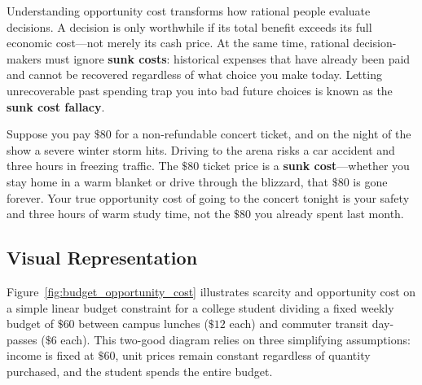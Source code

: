 \documentclass[11pt,letterpaper]{article}
\begin{document}
Understanding opportunity cost transforms how rational people evaluate decisions. A decision is only worthwhile if its total benefit exceeds its full economic cost—not merely its cash price. At the same time, rational decision-makers must ignore \textbf{sunk costs}: historical expenses that have already been paid and cannot be recovered regardless of what choice you make today. Letting unrecoverable past spending trap you into bad future choices is known as the \textbf{sunk cost fallacy}.

\begin{tcolorbox}[colback=yellow!10!white,colframe=orange!80!black,title=\textbf{Clear It Up: Sunk Costs Are Not Opportunity Costs}]
Suppose you pay $\$80$ for a non-refundable concert ticket, and on the night of the show a severe winter storm hits. Driving to the arena risks a car accident and three hours in freezing traffic. The $\$80$ ticket price is a \textbf{sunk cost}—whether you stay home in a warm blanket or drive through the blizzard, that $\$80$ is gone forever. Your true opportunity cost of going to the concert tonight is your safety and three hours of warm study time, not the $\$80$ you already spent last month.
\end{tcolorbox}

\subsection*{Visual Representation}
Figure~\ref{fig:budget_opportunity_cost} illustrates scarcity and opportunity cost on a simple linear budget constraint for a college student dividing a fixed weekly budget of $\$60$ between campus lunches ($\$12$ each) and commuter transit day-passes ($\$6$ each). This two-good diagram relies on three simplifying assumptions: income is fixed at $\$60$, unit prices remain constant regardless of quantity purchased, and the student spends the entire budget.
\end{document}
